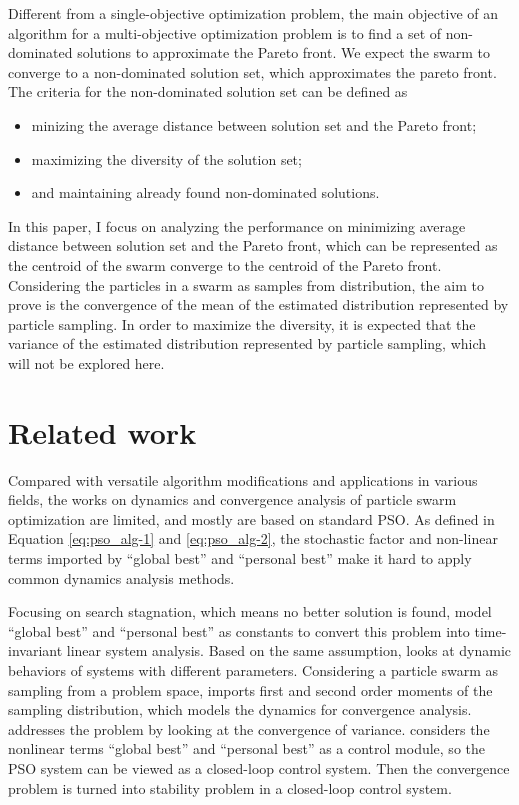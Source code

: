 \documentclass[12pt]{article}
\begin{document}
Different from a single-objective optimization problem, the main objective of an algorithm for a multi-objective optimization problem is to find a set of non-dominated solutions to approximate the Pareto front. We expect the swarm to converge to a non-dominated solution set, which approximates the pareto front. The criteria for the non-dominated solution set can be defined as 
\begin{itemize}
\item minizing the average distance between solution set and the Pareto front; 
\item maximizing the diversity of the solution set;
\item and maintaining already found non-dominated solutions.
\end{itemize}

In this paper, I focus on analyzing the performance on minimizing average distance between solution set and the Pareto front, which can be represented as the centroid of the swarm converge to the centroid of the Pareto front. Considering the particles in a swarm as samples from distribution, the aim to prove is the convergence of the mean of the estimated distribution represented by particle sampling. In order to maximize the diversity, it is expected that the variance of the estimated distribution represented by particle sampling, which will not be explored here.

\section{Related work}

Compared with versatile algorithm modifications and applications in various fields, the works on dynamics and convergence analysis of particle swarm optimization are limited, and mostly are based on standard PSO. As defined in Equation \eqref{eq:pso_alg-1} and \eqref{eq:pso_alg-2}, the stochastic factor and non-linear terms imported by ``global best'' and ``personal best'' make it hard to apply common dynamics analysis methods.

Focusing on search stagnation, which means no better solution is found, \cite{clerc2002particle} model ``global best'' and ``personal best'' as constants to convert this problem into time-invariant linear system analysis. Based on the same assumption, \cite{trelea2003particle} looks at dynamic behaviors of systems with different parameters. Considering a particle swarm as sampling from a problem space, \cite{poli2008dynamics} imports first and second order moments of the sampling distribution, which models the dynamics for convergence analysis. \cite{jiang2007stochastic} addresses the problem by looking at the convergence of variance. \cite{samal2007closed} considers the nonlinear terms ``global best'' and ``personal best'' as a control module, so the PSO system can be viewed as a closed-loop control system. Then the convergence problem is turned into stability problem in a closed-loop control system. 
\end{document}

